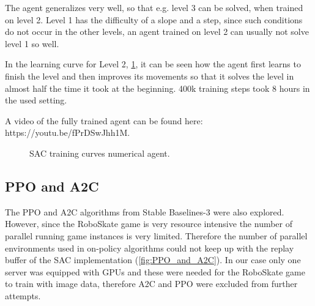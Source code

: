 \documentclass[conference]{IEEEtran}
\begin{document}
The agent generalizes very well, so that e.g. level 3 can be solved, when trained on level 2. Level 1 has the difficulty of a slope and a step, since such conditions do not occur in the other levels, an agent trained on level 2 can usually not solve level 1 so well.

In the learning curve for Level 2, \figurename  \ref{fig:SAC01learningcurv}, it can be seen how the agent first learns to finish the level and then improves its movements so that it solves the level in almost half the time it took at the beginning. 400k training steps took 8 hours in the used setting.

A video of the fully trained agent can be found here: https://youtu.be/fPrDSwJhh1M.


\begin{figure}[!t]
\centering
{}
\hfil
{}
\caption{SAC training curves numerical agent.}
\label{fig:SAC01learningcurv}
\end{figure}


\subsection{PPO and A2C}
The PPO \cite{schulman2017proximal} and A2C \cite{mnih2016asynchronous} algorithms from Stable Baselines-3 were also explored. However, since the RoboSkate game is very resource intensive the number of parallel running game instances is very limited. Therefore the number of parallel environments used in on-policy algorithms could not keep up with the replay buffer of the SAC implementation (\figurename  \ref{fig:PPO_and_A2C}).
In our case only one server was equipped with GPUs and these were needed for the RoboSkate game to train with image data, therefore A2C and PPO were excluded from further attempts.
\end{document}
